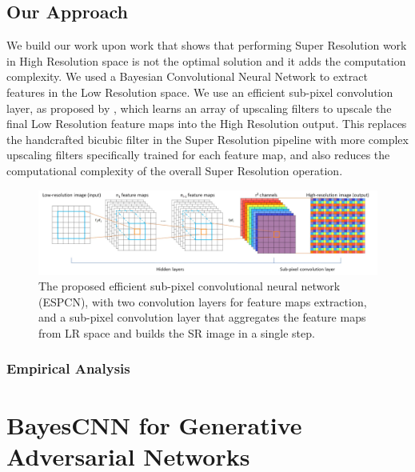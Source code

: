 \subsection{Our Approach}

We build our work upon \citet{DBLP:journals/corr/ShiCHTABRW16} work that shows that performing Super Resolution work in High Resolution space is not the optimal solution and it adds the computation complexity. We used a Bayesian Convolutional Neural Network to extract features in the Low Resolution space. We use an efficient sub-pixel convolution layer, as proposed by \citet{DBLP:journals/corr/ShiCHTABRW16}, which learns an array of upscaling filters to upscale the final Low Resolution feature maps into the High Resolution output. This replaces the handcrafted bicubic filter in the Super Resolution pipeline with more complex upscaling filters specifically trained for each feature map, and also reduces the computational complexity of the overall Super Resolution operation.

\begin{figure}[htbp]
\begin{center}
\includegraphics[width=1.0\linewidth]{Chapter6/Figs/networkstructure.jpg}
\caption{The proposed efficient sub-pixel convolutional neural network (ESPCN), with two convolution layers for feature maps extraction, and a sub-pixel convolution layer that aggregates the feature maps from \ac{LR} space and builds the \ac{SR} image in a single step.}
\label{fig:networkstructure}
\end{center}
\end{figure}

\subsubsection{Empirical Analysis}



\section{BayesCNN for Generative Adversarial Networks}

